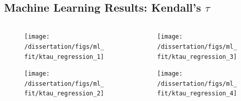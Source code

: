 \documentclass[t, pdftex]{beamer}
\begin{document}
\subsection*{Machine Learning Results: Kendall's $\tau$}
\begin{frame}
\vspace{-33pt}
\begin{columns}
    \begin{column}{0.5\textwidth}
        \begin{figure}[H]%
            \texttt{[image: /dissertation/figs/ml\_fit/ktau\_regression\_1]}
        \end{figure}
        \vspace{-26pt}
        \begin{figure}[H]%
            \texttt{[image: /dissertation/figs/ml\_fit/ktau\_regression\_2]}
        \end{figure}
    \end{column}
    \begin{column}{0.5\textwidth}
        \begin{figure}[H]%
            \texttt{[image: /dissertation/figs/ml\_fit/ktau\_regression\_3]}
        \end{figure}
        \vspace{-26pt}
        \begin{figure}[H]%
            \texttt{[image: /dissertation/figs/ml\_fit/ktau\_regression\_4]}
        \end{figure}
    \end{column}
\end{columns}
\end{frame}

\end{document}
